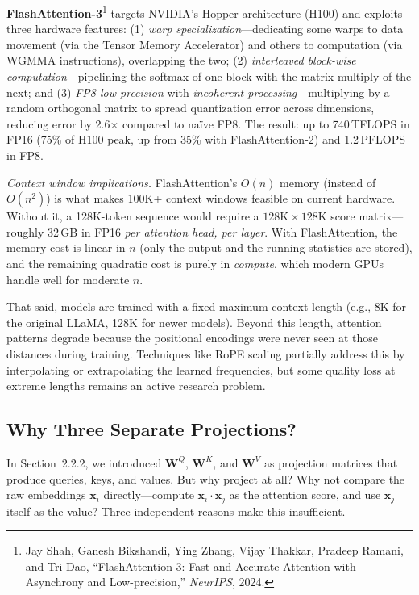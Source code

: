 \begin{notebox}
\textbf{FlashAttention-3}\footnote{Jay Shah, Ganesh Bikshandi, Ying Zhang, Vijay Thakkar, Pradeep Ramani, and Tri Dao, ``FlashAttention-3: Fast and Accurate Attention with Asynchrony and Low-precision,'' \emph{NeurIPS}, 2024.} targets NVIDIA's Hopper architecture (H100) and exploits three hardware features: (1) \emph{warp specialization}---dedicating some warps to data movement (via the Tensor Memory Accelerator) and others to computation (via WGMMA instructions), overlapping the two; (2) \emph{interleaved block-wise computation}---pipelining the softmax of one block with the matrix multiply of the next; and (3) \emph{FP8 low-precision} with \emph{incoherent processing}---multiplying by a random orthogonal matrix to spread quantization error across dimensions, reducing error by 2.6$\times$ compared to na\"ive FP8. The result: up to 740\,TFLOPS in FP16 (75\% of H100 peak, up from 35\% with FlashAttention-2) and 1.2\,PFLOPS in FP8.

\emph{Context window implications.} FlashAttention's $O(n)$ memory (instead of $O(n^2)$) is what makes 100K+ context windows feasible on current hardware. Without it, a 128K-token sequence would require a $128\text{K} \times 128\text{K}$ score matrix---roughly 32\,GB in FP16 \emph{per attention head, per layer}. With FlashAttention, the memory cost is linear in $n$ (only the output and the running statistics are stored), and the remaining quadratic cost is purely in \emph{compute}, which modern GPUs handle well for moderate $n$.

That said, models are trained with a fixed maximum context length (e.g., 8K for the original LLaMA, 128K for newer models). Beyond this length, attention patterns degrade because the positional encodings were never seen at those distances during training. Techniques like RoPE scaling partially address this by interpolating or extrapolating the learned frequencies, but some quality loss at extreme lengths remains an active research problem.
\end{notebox}

\subsection{Why Three Separate Projections?}

In Section~2.2.2, we introduced $\mathbf{W}^Q$, $\mathbf{W}^K$, and $\mathbf{W}^V$ as projection matrices that produce queries, keys, and values. But why project at all? Why not compare the raw embeddings $\mathbf{x}_i$ directly---compute $\mathbf{x}_i \cdot \mathbf{x}_j$ as the attention score, and use $\mathbf{x}_j$ itself as the value? Three independent reasons make this insufficient.

